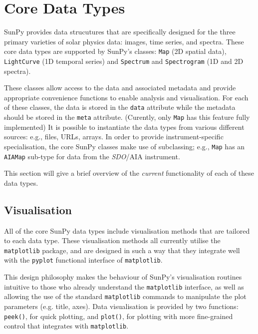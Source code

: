 \section{Core Data Types}\label{sec:DataTypes}

SunPy provides data strucutures that are specifically designed for the
three primary varieties of solar physics data: images, time series, and
spectra. These core data types are supported by SunPy's classes:
\texttt{Map} (2D spatial data), \texttt{LightCurve} (1D temporal series)
and \texttt{Spectrum} and \texttt{Spectrogram} (1D and 2D spectra). 

These classes allow access to the data
and associated metadata and provide appropriate convenience functions to
enable analysis and visualisation. For each of these classes, the data is
stored in the \texttt{data} attribute while the metadata should be stored 
in the \texttt{meta} attribute. (Curently, only \texttt{Map} has this feature fully implemented) 
It is possible to instantiate the
data types from various
different sources: e.g., files, URLs, arrays.  
In order to provide instrument-specific specialisation, the core SunPy classes 
make use of subclassing; e.g., \texttt{Map} has an \texttt{AIAMap} 
sub-type for data from the \textit{SDO}/AIA instrument. 

This section will give a brief overview of the \textit{current} functionality 
of each of these data types.

\subsection{Visualisation}
\label{subsec:Viz}
All of the core SunPy data types 
include visualisation methods that are tailored to each data type. 
These visualisation methods all currently utilise the \texttt{matplotlib} 
package, and are designed in such a way that they integrate well with 
the \texttt{pyplot} functional interface of \texttt{matplotlib}.

This design philosophy makes the behaviour of SunPy's visualisation 
routines intuitive to those who already understand the \texttt{matplotlib}
interface, as well as allowing the use of the standard 
\texttt{matplotlib} commands to manipulate the plot parameters (e.g. title, axes).
Data visualisation is provided by two functions: \texttt{peek()}, for quick 
plotting, and \texttt{plot()}, for plotting with more fine-grained control that 
integrates with \texttt{matplotlib}.




